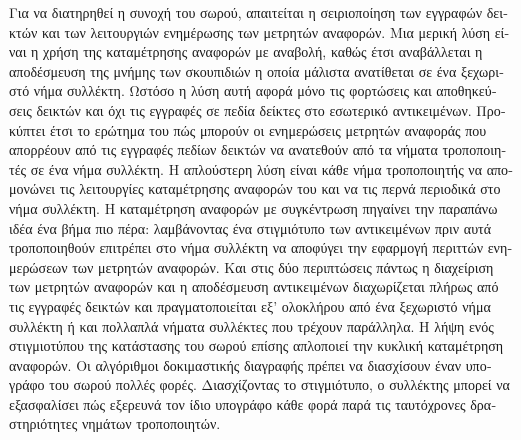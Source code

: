 \begin{greek}
Για να διατηρηθεί η συνοχή του σωρού, απαιτείται η σειριοποίηση
των εγγραφών δεικτών και των λειτουργιών ενημέρωσης των μετρητών
αναφορών. Μια μερική λύση είναι η χρήση της καταμέτρησης αναφορών
με αναβολή, καθώς έτσι αναβάλλεται η αποδέσμευση της μνήμης των 
σκουπιδιών η οποία μάλιστα ανατίθεται σε ένα ξεχωριστό νήμα
συλλέκτη. Ωστόσο η λύση αυτή αφορά μόνο τις φορτώσεις και
αποθηκεύσεις δεικτών και όχι τις εγγραφές σε πεδία δείκτες στο
εσωτερικό αντικειμένων. Προκύπτει έτσι το ερώτημα του πώς μπορούν
οι ενημερώσεις μετρητών αναφοράς που απορρέουν από τις εγγραφές
πεδίων δεικτών να ανατεθούν από τα νήματα τροποποιητές σε ένα
νήμα συλλέκτη. Η απλούστερη λύση είναι κάθε νήμα τροποποιητής
να απομονώνει τις λειτουργίες καταμέτρησης αναφορών του και να
τις περνά περιοδικά στο νήμα συλλέκτη. Η καταμέτρηση αναφορών
με συγκέντρωση πηγαίνει την παραπάνω ιδέα ένα βήμα πιο πέρα:
λαμβάνοντας ένα στιγμιότυπο των αντικειμένων πριν αυτά τροποποιηθούν
επιτρέπει στο νήμα συλλέκτη να αποφύγει την εφαρμογή περιττών
ενημερώσεων των μετρητών αναφορών. Και στις δύο περιπτώσεις
πάντως η διαχείριση των μετρητών αναφορών και η αποδέσμευση
αντικειμένων διαχωρίζεται πλήρως από τις εγγραφές δεικτών
και πραγματοποιείται εξ' ολοκλήρου από ένα ξεχωριστό νήμα
συλλέκτη ή και πολλαπλά νήματα συλλέκτες που τρέχουν παράλληλα.
Η λήψη ενός στιγμιοτύπου της κατάστασης του σωρού επίσης
απλοποιεί την κυκλική καταμέτρηση αναφορών. Οι αλγόριθμοι
δοκιμαστικής διαγραφής πρέπει να διασχίσουν έναν υπογράφο του
σωρού πολλές φορές. Διασχίζοντας το στιγμιότυπο, ο συλλέκτης
μπορεί να εξασφαλίσει πώς εξερευνά τον ίδιο υπογράφο κάθε
φορά παρά τις ταυτόχρονες δραστηριότητες νημάτων τροποποιητών.

\end{greek}
